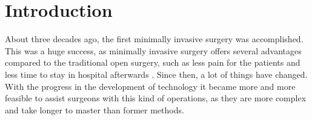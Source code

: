 \chapter{Introduction}

About three decades ago, the first minimally invasive surgery was accomplished. This was a huge success, as minimally invasive surgery offers several advantages compared to the traditional open surgery, such as less pain for the patients and less time to stay in hospital afterwards \cite{minimallyinvasive}. Since then, a lot of things have changed. With the progress in the development of technology it became more and more feasible to assist surgeons with this kind of operations, as they are more complex and take longer to master than former methods. 
